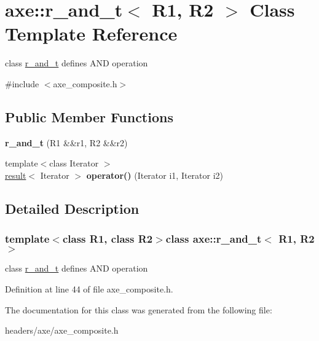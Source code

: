 \hypertarget{classaxe_1_1r__and__t}{\section{axe\+:\+:r\+\_\+and\+\_\+t$<$ R1, R2 $>$ Class Template Reference}
\label{classaxe_1_1r__and__t}
}


class \hyperlink{classaxe_1_1r__and__t}{r\+\_\+and\+\_\+t} defines A\+N\+D operation  




{\ttfamily \#include $<$axe\+\_\+composite.\+h$>$}

\subsection*{Public Member Functions}
\begin{DoxyCompactItemize}
\item 
\hypertarget{classaxe_1_1r__and__t_a3c9e7ca193d689f40ab4b5a7e5399cdf}{{\bfseries r\+\_\+and\+\_\+t} (R1 \&\&r1, R2 \&\&r2)}\label{classaxe_1_1r__and__t_a3c9e7ca193d689f40ab4b5a7e5399cdf}

\item 
\hypertarget{classaxe_1_1r__and__t_af810ef0d8f14960add0eecf29a7dbb7a}{{\footnotesize template$<$class Iterator $>$ }\\\hyperlink{structaxe_1_1result}{result}$<$ Iterator $>$ {\bfseries operator()} (Iterator i1, Iterator i2)}\label{classaxe_1_1r__and__t_af810ef0d8f14960add0eecf29a7dbb7a}

\end{DoxyCompactItemize}


\subsection{Detailed Description}
\subsubsection*{template$<$class R1, class R2$>$class axe\+::r\+\_\+and\+\_\+t$<$ R1, R2 $>$}

class \hyperlink{classaxe_1_1r__and__t}{r\+\_\+and\+\_\+t} defines A\+N\+D operation 

Definition at line 44 of file axe\+\_\+composite.\+h.



The documentation for this class was generated from the following file\+:\begin{DoxyCompactItemize}
\item 
headers/axe/axe\+\_\+composite.\+h\end{DoxyCompactItemize}

